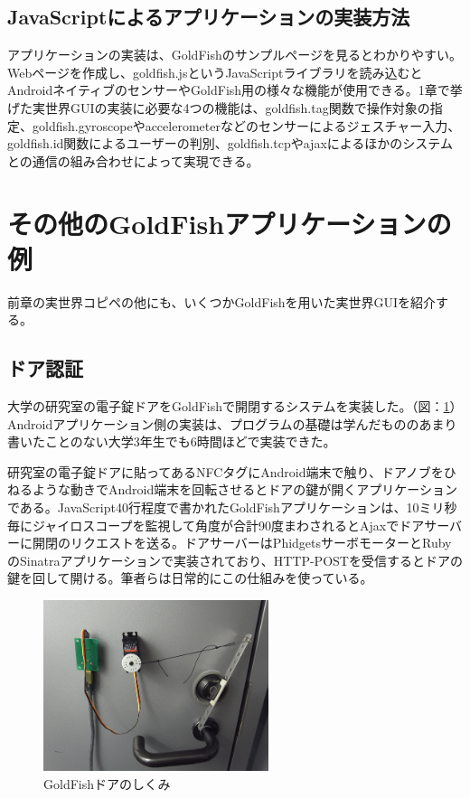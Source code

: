 \subsection{JavaScriptによるアプリケーションの実装方法}
アプリケーションの実装は、GoldFishのサンプルページ\cite{sample}を見るとわかりやすい。Webページを作成し、goldfish.jsというJavaScriptライブラリを読み込むとAndroidネイティブのセンサーやGoldFish用の様々な機能が使用できる。1章で挙げた実世界GUIの実装に必要な4つの機能は、goldfish.tag関数で操作対象の指定、goldfish.gyroscopeやaccelerometerなどのセンサーによるジェスチャー入力、goldfish.id関数によるユーザーの判別、goldfish.tcpやajaxによるほかのシステムとの通信の組み合わせによって実現できる。


\section{その他のGoldFishアプリケーションの例}
前章の実世界コピペの他にも、いくつかGoldFishを用いた実世界GUIを紹介する。

\subsection{ドア認証}
大学の研究室の電子錠ドアをGoldFishで開閉するシステムを実装した。（図：\ref{fig:door}）Androidアプリケーション側の実装は、プログラムの基礎は学んだもののあまり書いたことのない大学3年生でも6時間ほどで実装できた。

研究室の電子錠ドアに貼ってあるNFCタグにAndroid端末で触り、ドアノブをひねるような動きでAndroid端末を回転させるとドアの鍵が開くアプリケーションである。JavaScript40行程度で書かれたGoldFishアプリケーションは、10ミリ秒毎にジャイロスコープを監視して角度が合計90度まわされるとAjaxでドアサーバーに開閉のリクエストを送る。ドアサーバーはPhidgetsサーボモーターとRubyのSinatraアプリケーションで実装されており、HTTP-POSTを受信するとドアの鍵を回して開ける。筆者らは日常的にこの仕組みを使っている。

\begin{figure}
  \begin{center}
    \includegraphics[height=50mm]{img/door.png}
  \end{center}
  \caption{GoldFishドアのしくみ}
  \label{fig:door}
\end{figure}


